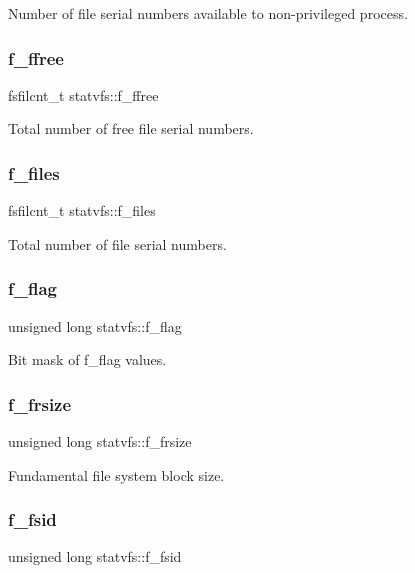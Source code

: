 Number of file serial numbers available to non-\/privileged process. \mbox{\label{structstatvfs_a601437cadd9c607cba0c653706af3d22}} 
\subsubsection{\texorpdfstring{f\_ffree}{f\_ffree}}
{\footnotesize\ttfamily fsfilcnt\+\_\+t statvfs\+::f\+\_\+ffree}

Total number of free file serial numbers. \mbox{\label{structstatvfs_a38f6a9335cabe3bff82c2d96cc538e6f}} 
\subsubsection{\texorpdfstring{f\_files}{f\_files}}
{\footnotesize\ttfamily fsfilcnt\+\_\+t statvfs\+::f\+\_\+files}

Total number of file serial numbers. \mbox{\label{structstatvfs_adb8f52b3e1b3a90358ec3e97e56aafcd}} 
\subsubsection{\texorpdfstring{f\_flag}{f\_flag}}
{\footnotesize\ttfamily unsigned long statvfs\+::f\+\_\+flag}

Bit mask of f\+\_\+flag values. \mbox{\label{structstatvfs_af01dafa58ce2f665bc8b6ba1741f1896}} 
\subsubsection{\texorpdfstring{f\_frsize}{f\_frsize}}
{\footnotesize\ttfamily unsigned long statvfs\+::f\+\_\+frsize}

Fundamental file system block size. \mbox{\label{structstatvfs_a1a180e536ad58f06b0c05d913d0ae9cf}} 
\subsubsection{\texorpdfstring{f\_fsid}{f\_fsid}}
{\footnotesize\ttfamily unsigned long statvfs\+::f\+\_\+fsid}

